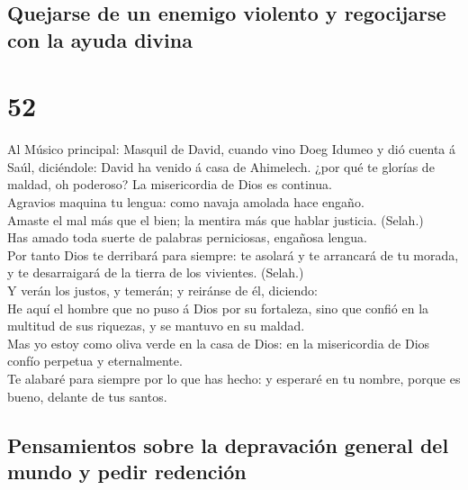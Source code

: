 \hypertarget{quejarse-de-un-enemigo-violento-y-regocijarse-con-la-ayuda-divina}{%
\subsection{Quejarse de un enemigo violento y regocijarse con la ayuda
divina}\label{quejarse-de-un-enemigo-violento-y-regocijarse-con-la-ayuda-divina}}

\hypertarget{section-19-52}{%
\section{52}\label{section-19-52}}

 Al Músico principal: Masquil de David, cuando vino Doeg
Idumeo y dió cuenta á Saúl, diciéndole: David ha venido á casa de
Ahimelech. ¿por qué te glorías de maldad, oh poderoso? La misericordia
de Dios es continua.\\
 Agravios maquina tu lengua: como navaja amolada hace
engaño.\\
 Amaste el mal más que el bien; la mentira más que hablar
justicia. (Selah.)\\
 Has amado toda suerte de palabras perniciosas, engañosa
lengua.\\
 Por tanto Dios te derribará para siempre: te asolará y te
arrancará de tu morada, y te desarraigará de la tierra de los vivientes.
(Selah.)\\
 Y verán los justos, y temerán; y reiránse de él,
diciendo:\\
 He aquí el hombre que no puso á Dios por su fortaleza,
sino que confió en la multitud de sus riquezas, y se mantuvo en su
maldad.\\
 Mas yo estoy como oliva verde en la casa de Dios: en la
misericordia de Dios confío perpetua y eternalmente.\\
 Te alabaré para siempre por lo que has hecho: y esperaré
en tu nombre, porque es bueno, delante de tus santos.

\hypertarget{pensamientos-sobre-la-depravaciuxf3n-general-del-mundo-y-pedir-redenciuxf3n-1}{%
\subsection{Pensamientos sobre la depravación general del mundo y pedir
redención}\label{pensamientos-sobre-la-depravaciuxf3n-general-del-mundo-y-pedir-redenciuxf3n-1}}

